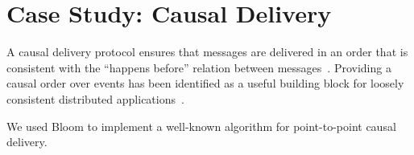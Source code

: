 \section{Case Study: Causal Delivery}

A causal delivery protocol ensures that messages are delivered in an order that
is consistent with the ``happens before'' relation between
messages~\cite{Lamport1978}. Providing a causal order over events has been
identified as a useful building block for loosely consistent distributed
applications~\cite{Lloyd2011}.

We used Bloom to implement a well-known algorithm for point-to-point causal
delivery\cite{Schiper1989}.
